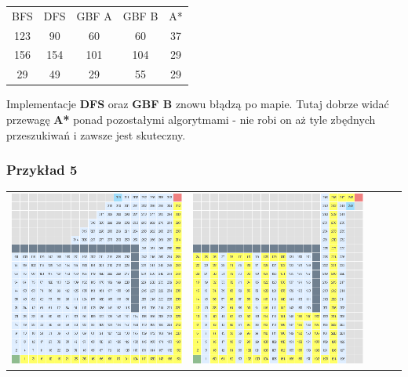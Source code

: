 \documentclass{article}
\begin{document}
\begin{center}
\begin{tabular}{c c c c c}
BFS & DFS & GBF A & GBF B & A* \\
123 & 90 & 60 & 60 & 37 \\
156 & 154 & 101 & 104 & 29\\
29 & 49 & 29 & 55 & 29\\
\end{tabular}
\end{center}
Implementacje \textbf{DFS} oraz \textbf{GBF B} znowu błądzą po mapie. Tutaj dobrze widać przewagę \textbf{A*} ponad pozostałymi algorytmami - nie robi on aż tyle zbędnych przeszukiwań i zawsze jest skuteczny.

\subsubsection{Przykład 5}
\begin{center}
\begin{tabular}{c c c c c}
\includegraphics[scale=0.15]{images/scr31.png} &
\includegraphics[scale=0.15]{images/scr32.png} &

\end{tabular}
\end{center}
\end{document}

